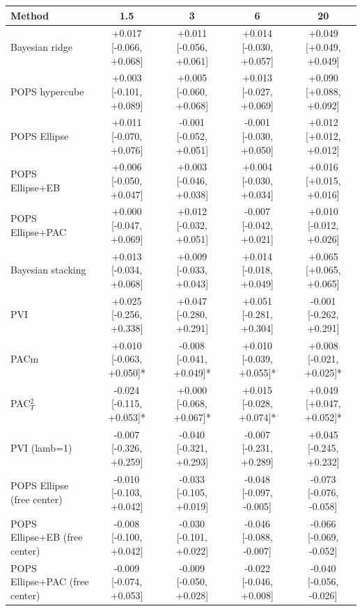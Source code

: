 \begin{tabular}{lcccc}
\toprule
Method & 1.5 & 3 & 6 & 20 \\
\midrule
Bayesian ridge & +0.017 {\scriptsize[-0.066, +0.068]} & +0.011 {\scriptsize[-0.056, +0.061]} & +0.014 {\scriptsize[-0.030, +0.057]} & +0.049 {\scriptsize[+0.049, +0.049]} \\
POPS hypercube & +0.003 {\scriptsize[-0.101, +0.089]} & +0.005 {\scriptsize[-0.060, +0.068]} & +0.013 {\scriptsize[-0.027, +0.069]} & +0.090 {\scriptsize[+0.088, +0.092]} \\
POPS Ellipse & +0.011 {\scriptsize[-0.070, +0.076]} & -0.001 {\scriptsize[-0.052, +0.051]} & -0.001 {\scriptsize[-0.030, +0.050]} & +0.012 {\scriptsize[+0.012, +0.012]} \\
POPS Ellipse+EB & +0.006 {\scriptsize[-0.050, +0.047]} & +0.003 {\scriptsize[-0.046, +0.038]} & +0.004 {\scriptsize[-0.030, +0.034]} & +0.016 {\scriptsize[+0.015, +0.016]} \\
POPS Ellipse+PAC & +0.000 {\scriptsize[-0.047, +0.069]} & +0.012 {\scriptsize[-0.032, +0.051]} & -0.007 {\scriptsize[-0.042, +0.021]} & +0.010 {\scriptsize[-0.012, +0.026]} \\
Bayesian stacking & +0.013 {\scriptsize[-0.034, +0.068]} & +0.009 {\scriptsize[-0.033, +0.043]} & +0.014 {\scriptsize[-0.018, +0.049]} & +0.065 {\scriptsize[+0.065, +0.065]} \\
PVI & +0.025 {\scriptsize[-0.256, +0.338]} & +0.047 {\scriptsize[-0.280, +0.291]} & +0.051 {\scriptsize[-0.281, +0.304]} & -0.001 {\scriptsize[-0.262, +0.291]} \\
PACm & +0.010 {\scriptsize[-0.063, +0.050]}* & -0.008 {\scriptsize[-0.041, +0.049]}* & +0.010 {\scriptsize[-0.039, +0.055]}* & +0.008 {\scriptsize[-0.021, +0.025]}* \\
PAC$^2_T$ & -0.024 {\scriptsize[-0.115, +0.053]}* & +0.000 {\scriptsize[-0.068, +0.067]}* & +0.015 {\scriptsize[-0.028, +0.074]}* & +0.049 {\scriptsize[+0.047, +0.052]}* \\
PVI (lamb=1) & -0.007 {\scriptsize[-0.326, +0.259]} & -0.040 {\scriptsize[-0.321, +0.293]} & -0.007 {\scriptsize[-0.231, +0.289]} & +0.045 {\scriptsize[-0.245, +0.232]} \\
POPS Ellipse (free center) & -0.010 {\scriptsize[-0.103, +0.042]} & -0.033 {\scriptsize[-0.105, +0.019]} & -0.048 {\scriptsize[-0.097, -0.005]} & -0.073 {\scriptsize[-0.076, -0.058]} \\
POPS Ellipse+EB (free center) & -0.008 {\scriptsize[-0.100, +0.042]} & -0.030 {\scriptsize[-0.101, +0.022]} & -0.046 {\scriptsize[-0.088, -0.007]} & -0.066 {\scriptsize[-0.069, -0.052]} \\
POPS Ellipse+PAC (free center) & -0.009 {\scriptsize[-0.074, +0.053]} & -0.009 {\scriptsize[-0.050, +0.028]} & -0.022 {\scriptsize[-0.046, +0.008]} & -0.040 {\scriptsize[-0.056, -0.026]} \\
\bottomrule
\end{tabular}
